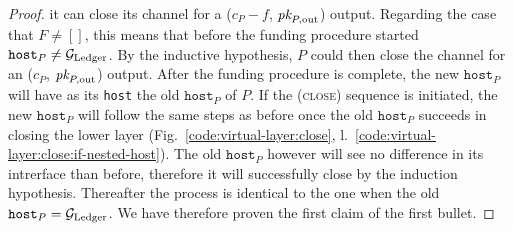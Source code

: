 \begin{proof}
  it can close its channel for a ($c_P - f$, $\textit{pk}_{P, \mathrm{out}}$) output.
  Regarding the case that $F \neq []$, this means that before the funding
  procedure started $\texttt{host}_P \neq \mathcal{G}_{\mathrm{Ledger}}$. By the inductive hypothesis,
  $P$ could then close the channel for an ($c_P$, $\textit{pk}_{P, \mathrm{out}}$)
  output. After the funding procedure is complete, the new $\texttt{host}_P$
  will have as its \texttt{host} the old $\texttt{host}_P$ of $P$. If the
  (\textsc{close}) sequence is initiated, the new $\texttt{host}_P$ will follow
  the same steps as before once the old $\texttt{host}_P$ succeeds in closing
  the lower layer (Fig.~\ref{code:virtual-layer:close},
  l.~\ref{code:virtual-layer:close:if-nested-host}). The old $\texttt{host}_P$
  however will see no difference in its intrerface than before, therefore it
  will successfully close by the induction hypothesis. Thereafter the process is
  identical to the one when the old $\texttt{host}_P = \mathcal{G}_{\mathrm{Ledger}}$. We have
  therefore proven the first claim of the first bullet.
\end{proof}

